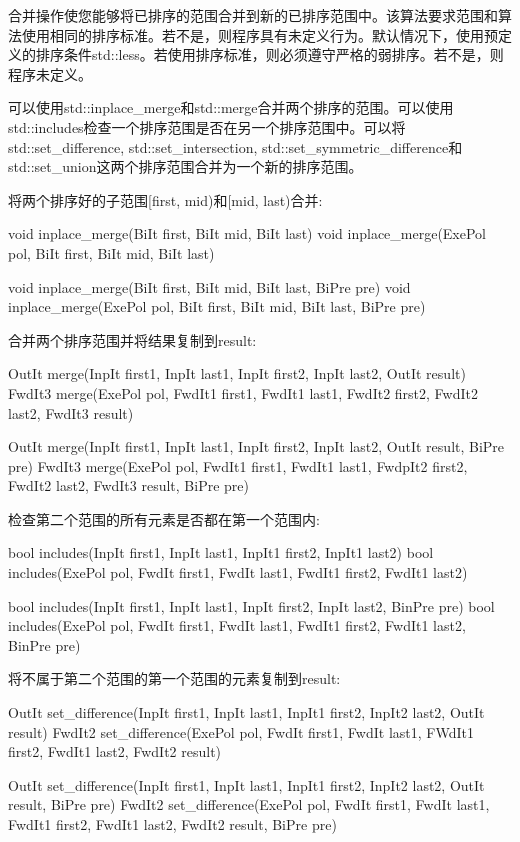 合并操作使您能够将已排序的范围合并到新的已排序范围中。该算法要求范围和算法使用相同的排序标准。若不是，则程序具有未定义行为。默认情况下，使用预定义的排序条件std::less。若使用排序标准，则必须遵守严格的弱排序。若不是，则程序未定义。

可以使用std::inplace\_merge和std::merge合并两个排序的范围。可以使用std::includes检查一个排序范围是否在另一个排序范围中。可以将std::set\_difference, std::set\_intersection, std::set\_symmetric\_difference和std::set\_union这两个排序范围合并为一个新的排序范围。

将两个排序好的子范围[first, mid)和[mid, last)合并:

\begin{cpp}
void inplace_merge(BiIt first, BiIt mid, BiIt last)
void inplace_merge(ExePol pol, BiIt first, BiIt mid, BiIt last)

void inplace_merge(BiIt first, BiIt mid, BiIt last, BiPre pre)
void inplace_merge(ExePol pol, BiIt first, BiIt mid, BiIt last, BiPre pre)
\end{cpp}

合并两个排序范围并将结果复制到result:

\begin{cpp}
OutIt merge(InpIt first1, InpIt last1, InpIt first2, InpIt last2, OutIt result)
FwdIt3 merge(ExePol pol, FwdIt1 first1, FwdIt1 last1,
		     FwdIt2 first2, FwdIt2 last2, FwdIt3 result)

OutIt merge(InpIt first1, InpIt last1, InpIt first2, InpIt last2, OutIt result,
			BiPre pre)
FwdIt3 merge(ExePol pol, FwdIt1 first1, FwdIt1 last1,
			 FwdpIt2 first2, FwdIt2 last2, FwdIt3 result, BiPre pre)
\end{cpp}

检查第二个范围的所有元素是否都在第一个范围内:

\begin{cpp}
bool includes(InpIt first1, InpIt last1, InpIt1 first2, InpIt1 last2)
bool includes(ExePol pol, FwdIt first1, FwdIt last1, FwdIt1 first2, FwdIt1 last2)

bool includes(InpIt first1, InpIt last1, InpIt first2, InpIt last2, BinPre pre)
bool includes(ExePol pol, FwdIt first1, FwdIt last1,
			  FwdIt1 first2, FwdIt1 last2, BinPre pre)
\end{cpp}

将不属于第二个范围的第一个范围的元素复制到result:

\begin{cpp}
OutIt set_difference(InpIt first1, InpIt last1, InpIt1 first2, InpIt2 last2,
					 OutIt result)
FwdIt2 set_difference(ExePol pol, FwdIt first1, FwdIt last1,
					  FWdIt1 first2, FwdIt1 last2, FwdIt2 result)
					  
OutIt set_difference(InpIt first1, InpIt last1, InpIt1 first2, InpIt2 last2,
					 OutIt result, BiPre pre)
FwdIt2 set_difference(ExePol pol, FwdIt first1, FwdIt last1,
					  FwdIt1 first2, FwdIt1 last2, FwdIt2 result, BiPre pre)
\end{cpp}

